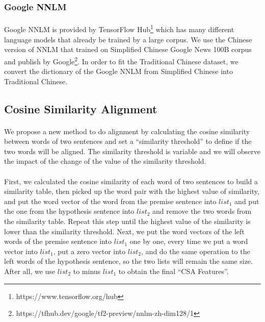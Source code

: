 \documentclass{article}
\begin{document}
\begin{CJK*}{UTF8}{bkai}
\subsubsection{Google NNLM}
\paragraph{}
Google NNLM is provided by TensorFlow Hub\footnote{https://www.tensorflow.org/hub} which has many different language models that already be trained by a large corpus. We use the Chinese version of NNLM that trained on Simplified Chinese Google News 100B corpus and publish by Google\footnote{https://tfhub.dev/google/tf2-preview/nnlm-zh-dim128/1}. In order to fit the Traditional Chinese dataset, we convert the dictionary of the Google NNLM from Simplified Chinese into Traditional Chinese.

\subsection{Cosine Similarity Alignment} \label{section:csa}
\paragraph{}
We propose a new method to do alignment by calculating the cosine similarity between words of two sentences and set a ``similarity threshold'' to define if the two words will be aligned. The similarity threshold is variable and we will observe the impact of the change of the value of the similarity threshold.

\paragraph{}
First, we calculated the cosine similarity of each word of two sentences to build a similarity table, then picked up the word pair with the highest value of similarity, and put the word vector of the word from the premise sentence into $list_1$ and put the one from the hypothesis sentence into $list_2$ and remove the two words from the similarity table. Repeat this step until the highest value of the similarity is lower than the similarity threshold. Next, we put the word vectors of the left words of the premise sentence into $list_1$ one by one, every time we put a word vector into $list_1$, put a zero vector into $list_2$, and do the same operation to the left words of the hypothesis sentence, so the two lists will remain the same size. After all, we use $list_2$ to minus $list_1$ to obtain the final ``CSA Features''.


\end{CJK*}
\end{document}
